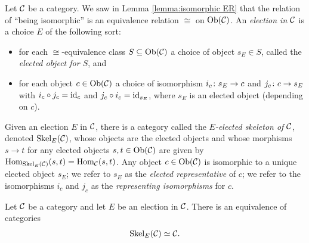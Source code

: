 \documentclass[CT4S-EN-RU]{subfiles}
\begin{document}
\begin{definitionENG}[Skeleton]
Let $\mathcal{C}$ be a category. We saw in Lemma \ref{lemma:isomorphic ER} that the relation of “being isomorphic” is an equivalence relation $\cong$ on $\textnormal{Ob}(\mathcal{C})$. An {\em election in $\mathcal{C}$} is a choice $E$ of the following sort:
\begin{itemize}
\item for each $\cong$-equivalence class $S\subseteq\textnormal{Ob}(\mathcal{C})$ a choice of object $s_E\in S$, called the {\em elected object for $S$}, and
\item for each object $c\in\textnormal{Ob}(\mathcal{C})$ a choice of isomorphism $i_c\colon s_E\rightarrow c$ and $j_c\colon c\rightarrow s_E$ with $i_c\circ j_c=\textnormal{id}_c$ and $j_c\circ i_c=\textnormal{id}_{s_E}$, where $s_E$ is an elected object (depending on $c$).
\end{itemize}
Given an election $E$ in $\mathcal{C}$, there is a category called the {\em $E$-elected skeleton of $\mathcal{C}$}, denoted $\textnormal{Skel}_E(\mathcal{C})$, whose objects are the elected objects and whose morphisms $s\to t$ for any elected objects $s,t\in\textnormal{Ob}(\mathcal{C})$ are given by $\textnormal{Hom}_{\textnormal{Skel}_E(\mathcal{C})}(s,t)=\textnormal{Hom}_\mathcal{C}(s,t)$. Any object $c\in\textnormal{Ob}(\mathcal{C})$ is isomorphic to a unique elected object $s_E$; we refer to $s_E$ as the {\em elected representative} of $c$; we refer to the isomorphisms $i_c$ and $j_c$ as the {\em representing isomorphisms} for $c$.
\end{definitionENG}

\begin{definitionRUS}[Skeleton]
\end{definitionRUS}

\begin{propositionENG}
Let $\mathcal{C}$ be a category and let $E$ be an election in $\mathcal{C}$. There is an equivalence of categories $$\textnormal{Skel}_E(\mathcal{C})\simeq\mathcal{C}.$$
\end{propositionENG}

\begin{propositionRUS}
\end{propositionRUS}
\end{document}
